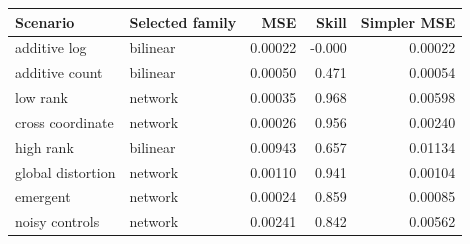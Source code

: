 \begin{tabular}{llrrr}
\toprule
Scenario & Selected family & MSE & Skill & Simpler MSE \\
\midrule
additive log & bilinear & 0.00022 & -0.000 & 0.00022 \\
additive count & bilinear & 0.00050 & 0.471 & 0.00054 \\
low rank & network & 0.00035 & 0.968 & 0.00598 \\
cross coordinate & network & 0.00026 & 0.956 & 0.00240 \\
high rank & bilinear & 0.00943 & 0.657 & 0.01134 \\
global distortion & network & 0.00110 & 0.941 & 0.00104 \\
emergent & network & 0.00024 & 0.859 & 0.00085 \\
noisy controls & network & 0.00241 & 0.842 & 0.00562 \\
\bottomrule
\end{tabular}
